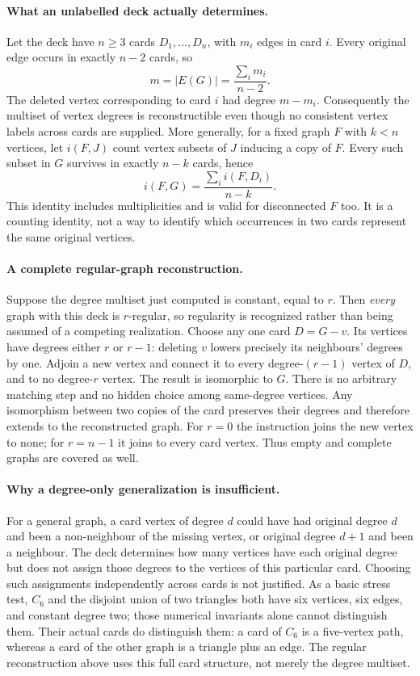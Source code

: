 \documentclass[11pt,a4paper]{article}
\begin{document}
\paragraph{What an unlabelled deck actually determines.}
Let the deck have $n\ge3$ cards $D_1,\ldots,D_n$, with $m_i$ edges in card
$i$. Every original edge occurs in exactly $n-2$ cards, so
\[
                  m=|E(G)|=\frac{\sum_i m_i}{n-2}.
\]
The deleted vertex corresponding to card $i$ had degree $m-m_i$.
Consequently the multiset of vertex degrees is reconstructible even though
no consistent vertex labels across cards are supplied.
More generally, for a fixed graph $F$ with $k<n$ vertices, let $i(F,J)$ count
vertex subsets of $J$ inducing a copy of $F$. Every such subset in $G$
survives in exactly $n-k$ cards, hence
\[
                 i(F,G)=\frac{\sum_i i(F,D_i)}{n-k}.
\]
This identity includes multiplicities and is valid for disconnected $F$ too.
It is a counting identity, not a way to identify which occurrences in two
cards represent the same original vertices.

\paragraph{A complete regular-graph reconstruction.}
Suppose the degree multiset just computed is constant, equal to $r$. Then
\emph{every} graph with this deck is $r$-regular, so regularity is recognized
rather than being assumed of a competing realization. Choose any one card
$D=G-v$. Its vertices have degrees either $r$ or $r-1$: deleting $v$ lowers
precisely its neighbours' degrees by one. Adjoin a new vertex and connect it
to every degree-$(r-1)$ vertex of $D$, and to no degree-$r$ vertex. The result
is isomorphic to $G$. There is no arbitrary matching step and no hidden
choice among same-degree vertices. Any isomorphism between two copies of the
card preserves their degrees and therefore extends to the reconstructed graph.
For $r=0$ the instruction joins the new vertex to none; for $r=n-1$ it joins
to every card vertex. Thus empty and complete graphs are covered as well.

\paragraph{Why a degree-only generalization is insufficient.}
For a general graph, a card vertex of degree $d$ could have had original
degree $d$ and been a non-neighbour of the missing vertex, or original degree
$d+1$ and been a neighbour. The deck determines how many vertices have each
original degree but does not assign those degrees to the vertices of this
particular card. Choosing such assignments independently across cards is not
justified. As a basic stress test, $C_6$ and the disjoint union of two triangles
both have six vertices, six edges, and constant degree two; those numerical
invariants alone cannot distinguish them. Their actual cards do distinguish
them: a card of $C_6$ is a five-vertex path, whereas a card of the other graph
is a triangle plus an edge. The regular reconstruction above uses this full
card structure, not merely the degree multiset.
\end{document}
